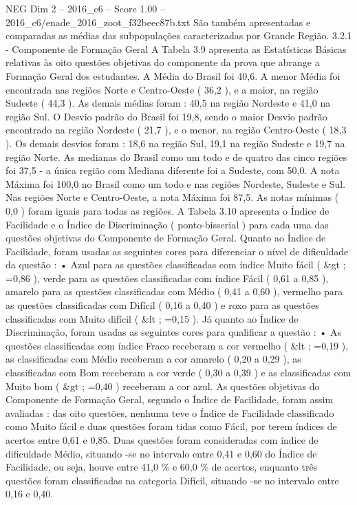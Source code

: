 \begin{textsample}{NEG Dim 2 – 2016\_c6 – Score 1.00 – 2016\_c6/enade\_2016\_zoot\_f32beec87b.txt}
São também apresentadas e comparadas as médias das subpopulações caracterizadas por Grande Região. 3.2.1 - Componente de Formação Geral A Tabela 3.9 apresenta as Estatísticas Básicas relativas às oito questões objetivas do componente da prova que abrange a Formação Geral dos estudantes.
A Média do Brasil foi 40,6.
A menor Média foi encontrada nas regiões Norte e Centro-Oeste ( 36,2 ), e a maior, na região Sudeste ( 44,3 ).
As demais médias foram : 40,5 na região Nordeste e 41,0 na região Sul.
O Desvio padrão do Brasil foi 19,8, sendo o maior Desvio padrão encontrado na região Nordeste ( 21,7 ), e o menor, na região Centro-Oeste ( 18,3 ).
Os demais desvios foram : 18,6 na região Sul, 19,1 na região Sudeste e 19,7 na região Norte.
As medianas do Brasil como um todo e de quatro das cinco regiões foi 37,5 - a única região com Mediana diferente foi a Sudeste, com 50,0.
A nota Máxima foi 100,0 no Brasil como um todo e nas regiões Nordeste, Sudeste e Sul.
Nas regiões Norte e Centro-Oeste, a nota Máxima foi 87,5.
As notas mínimas ( 0,0 ) foram iguais para todas as regiões.
A Tabela 3.10 apresenta o Índice de Facilidade e o Índice de Discriminação ( ponto-bisserial ) para cada uma das questões objetivas do Componente de Formação Geral.
Quanto ao Índice de Facilidade, foram usadas as seguintes cores para diferenciar o nível de dificuldade da questão : • Azul para as questões classificadas com índice Muito fácil ( \&gt ; =0,86 ), verde para as questões classificadas com índice Fácil ( 0,61 a 0,85 ), amarelo para as questões classificadas com Médio ( 0,41 a 0,60 ), vermelho para as questões classificadas com Difícil ( 0,16 a 0,40 ) e roxo para as questões classificadas com Muito difícil ( \&lt ; =0,15 ).
Já quanto ao Índice de Discriminação, foram usadas as seguintes cores para qualificar a questão : • As questões classificadas com índice Fraco receberam a cor vermelho ( \&lt ; =0,19 ), as classificadas com Médio receberam a cor amarelo ( 0,20 a 0,29 ), as classificadas com Bom receberam a cor verde ( 0,30 a 0,39 ) e as classificadas com Muito bom ( \&gt ; =0,40 ) receberam a cor azul.
As questões objetivas do Componente de Formação Geral, segundo o Índice de Facilidade, foram assim avaliadas : das oito questões, nenhuma teve o Índice de Facilidade classificado como Muito fácil e duas questões foram tidas como Fácil, por terem índices de acertos entre 0,61 e 0,85.
Duas questões foram consideradas com índice de dificuldade Médio, situando -se no intervalo entre 0,41 e 0,60 do Índice de Facilidade, ou seja, houve entre 41,0 \% e 60,0 \% de acertos, enquanto três questões foram classificadas na categoria Difícil, situando -se no intervalo entre 0,16 e 0,40.

\end{textsample}
